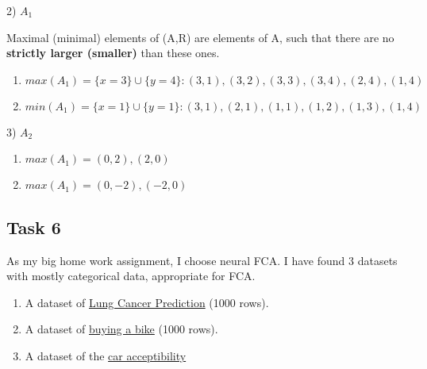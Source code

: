 2) $A_1$

Maximal (minimal) elements of (A,R) are elements of A, such that there are no \textbf{strictly larger (smaller)} than these ones.

\begin{enumerate}
\item $max(A_1) = \{x = 3\} \cup \{y = 4\}: (3, 1), (3, 2), (3, 3), (3, 4), (2, 4), (1, 4)$
\item $min(A_1) = \{x=1\} \cup \{y=1\}: (3, 1), (2, 1), (1, 1), (1, 2), (1, 3), (1, 4) $
\end{enumerate}

3) $A_2$

\begin{enumerate}
\item $max(A_1) = (0,2), (2,0)$
\item $max(A_1) = (0,-2), (-2,0)$
\end{enumerate}

\subsection{Task 6}

As my big home work assignment, I choose neural FCA.
I have found 3 datasets with mostly categorical data, appropriate for FCA.

\begin{enumerate}
\item A dataset of \href{https://www.kaggle.com/datasets/thedevastator/cancer-patients-and-air-pollution-a-new-link}{Lung Cancer Prediction} (1000 rows).
\item A dataset of \href{https://www.kaggle.com/datasets/heeraldedhia/bike-buyers}{buying a bike} (1000 rows).
\item A dataset of the \href{https://www.kaggle.com/datasets/subhajeetdas/car-acceptability-classification-dataset}{car acceptibility}
\end{enumerate}
